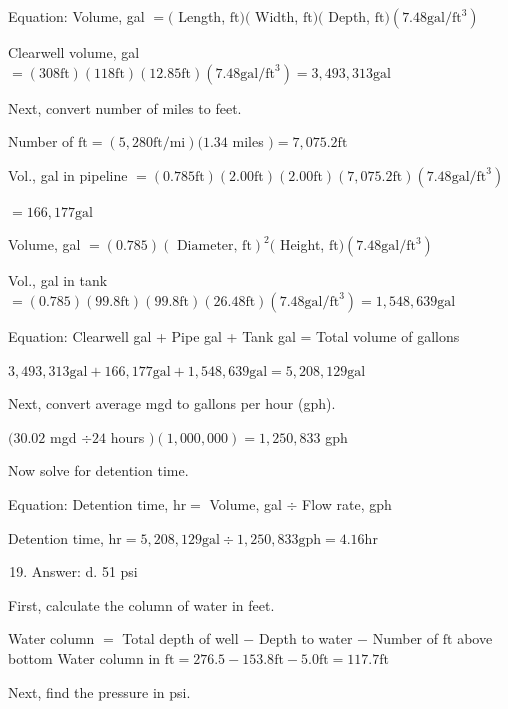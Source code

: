 \documentclass[10pt]{article}
\begin{document}
Equation: Volume, gal $=($ Length, $\mathrm{ft})($ Width, $\mathrm{ft})($ Depth, $\mathrm{ft})\left(7.48 \mathrm{gal} / \mathrm{ft}^{3}\right)$

Clearwell volume, gal $=(308 \mathrm{ft})(118 \mathrm{ft})(12.85 \mathrm{ft})\left(7.48 \mathrm{gal} / \mathrm{ft}^{3}\right)=3,493,313 \mathrm{gal}$

Next, convert number of miles to feet.

Number of $\mathrm{ft}=(5,280 \mathrm{ft} / \mathrm{mi})(1.34$ miles $)=7,075.2 \mathrm{ft}$

Vol., gal in pipeline $=(0.785 \mathrm{ft})(2.00 \mathrm{ft})(2.00 \mathrm{ft})(7,075.2 \mathrm{ft})\left(7.48 \mathrm{gal} / \mathrm{ft}^{3}\right)$

$=166,177 \mathrm{gal}$

Volume, gal $=(0.785)(\text { Diameter, } \mathrm{ft})^{2}($ Height, $\mathrm{ft})\left(7.48 \mathrm{gal} / \mathrm{ft}^{3}\right)$

Vol., gal in tank $=(0.785)(99.8 \mathrm{ft})(99.8 \mathrm{ft})(26.48 \mathrm{ft})\left(7.48 \mathrm{gal} / \mathrm{ft}^{3}\right)=1,548,639 \mathrm{gal}$

Equation: Clearwell gal + Pipe gal + Tank gal = Total volume of gallons

$3,493,313 \mathrm{gal}+166,177 \mathrm{gal}+1,548,639 \mathrm{gal}=5,208,129 \mathrm{gal}$

Next, convert average mgd to gallons per hour (gph).

$(30.02$ mgd $\div 24$ hours $)(1,000,000)=1,250,833$ gph

Now solve for detention time.

Equation: Detention time, $\mathrm{hr}=$ Volume, gal $\div$ Flow rate, gph

Detention time, $\mathrm{hr}=5,208,129 \mathrm{gal} \div 1,250,833 \mathrm{gph}=4.16 \mathrm{hr}$

\begin{enumerate}
  \setcounter{enumi}{18}
  \item Answer: d. 51 psi
\end{enumerate}

First, calculate the column of water in feet.

Water column $=$ Total depth of well $-$ Depth to water $-$ Number of $\mathrm{ft}$ above bottom Water column in $\mathrm{ft}=276.5-153.8 \mathrm{ft}-5.0 \mathrm{ft}=117.7 \mathrm{ft}$

Next, find the pressure in psi.
\end{document}
